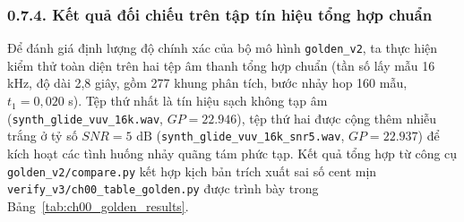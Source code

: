 \subsubsection*{0.7.4. Kết quả đối chiếu trên tập tín hiệu tổng hợp chuẩn}
Để đánh giá định lượng độ chính xác của bộ mô hình \texttt{golden\_v2}, ta thực hiện kiểm thử toàn diện trên hai tệp âm thanh tổng hợp chuẩn (tần số lấy mẫu 16 kHz, độ dài 2,8 giây, gồm 277 khung phân tích, bước nhảy hop 160 mẫu, $t_1 = 0{,}020$ s). Tệp thứ nhất là tín hiệu sạch không tạp âm (\texttt{synth\_glide\_vuv\_16k.wav}, $GP = 22.946$), tệp thứ hai được cộng thêm nhiễu trắng ở tỷ số $SNR = 5\text{ dB}$ (\texttt{synth\_}\linebreak[0]\texttt{glide\_}\linebreak[0]\texttt{vuv\_}\linebreak[0]\texttt{16k\_}\linebreak[0]\texttt{snr5.wav}, $GP = 22.937$) để kích hoạt các tình huống nhảy quãng tám phức tạp. Kết quả tổng hợp từ công cụ \texttt{golden\_v2/}\linebreak[0]\texttt{compare.py} kết hợp kịch bản trích xuất sai số cent mịn \texttt{verify\_v3/ch00\_table\_golden.py} được trình bày trong Bảng~\ref{tab:ch00_golden_results}.

